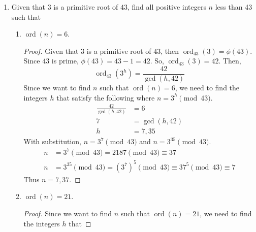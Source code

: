 \documentclass[11pt]{article}
\theoremstyle{definition}
\newcommand{\ord}{\operatorname{ord}}
\begin{document}
\begin{enumerate}
    Hint: If you want to show that two multiplicative functions $f$ and $g$ are the same, it is enough to show that $f(p^k) = g(p^k)$ for prime powers $p^k$.
    \begin{proof}
        \begin{align*}
            \sigma(n) &= \displaystyle\sum_{d\mid n}^{}d \\
            &= \displaystyle\sum_{d\mid n}^{}\frac{n}{d} \\
            &= n\displaystyle\sum_{d\mid n}^{}\frac{1}{d} \\
            \frac{\sigma(n)}{n} &= \displaystyle\sum_{d\mid n}^{}\frac{1}{d}
        \end{align*}
    \end{proof}

    \item Given that $3$ is a primitive root of $43$, find all positive integers $n$ less than 43 such that
    \begin{enumerate}
        \item $\ord(n) = 6$.
        \begin{proof}
            Given that $3$ is a primitive root of $43$, then $\ord_{43}(3) = \phi(43)$.
            Since $43$ is prime, $\phi(43) = 43-1 = 42$. So, $\ord_{43}(3) = 42$. Then,
            \[ 
                \ord_{43}(3^h) = \frac{42}{\gcd(h,42)}
            \]
            Since we want to find $n$ such that $\ord(n)=6$, we need to find the integers $h$ that
            satisfy the following where $n=3^h\pmod{43}$.
            \begin{align*}
                \frac{42}{\gcd(h,42)} &= 6 \\
                7 &= \gcd(h,42) \\
                h &= 7,35
            \end{align*}
            With substitution, $n = 3^7\pmod{43}$ and $n = 3^{35}\pmod{43}$.
            \begin{align*}
                n &= 3^7\pmod{43} = 2187\pmod{43}\equiv 37 \\
                n &= 3^{35}\pmod{43} = (3^{7})^5\pmod{43}\equiv 37^5\pmod{43}\equiv 7
            \end{align*}
            Thus $n = 7,37$.
        \end{proof}
        \item $\ord(n) = 21$.
        \begin{proof}
            Since we want to find $n$ such that $\ord(n)=21$, we need to find the integers $h$ that

\end{proof}
\end{enumerate}
\end{enumerate}
\end{document}
